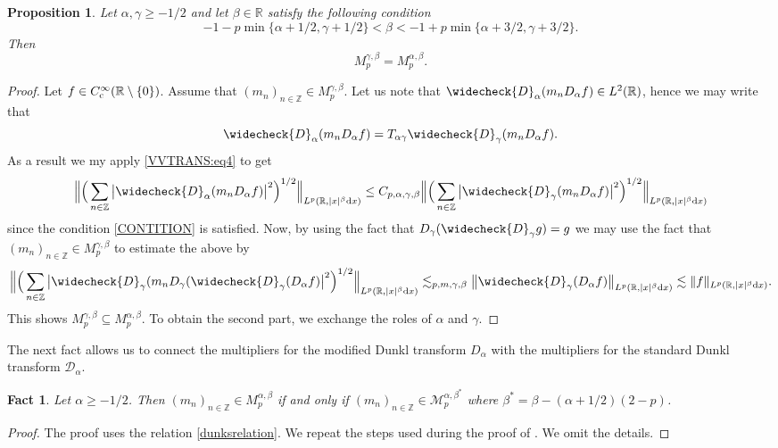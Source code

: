 \documentclass[11pt,oneside]{amsart}
\numberwithin{equation}{section}
\newtheorem{proposition}[equation]{Proposition}
\newtheorem{fact}[equation]{Fact}
\theoremstyle{definition}
\newcommand{\RR}{\mathbb{R}}
\newcommand{\ZZ}{\mathbb{Z}}
\begin{document}
\begin{proposition}\label{prop:multi}
Let $\alpha,\gamma\geq-1/2$ and let $\beta\in\RR$ satisfy the following condition
\begin{equation}\label{CONTITION}
    -1-p\min{\big\{\alpha+1/2,\gamma+1/2\big\}}<\beta<-1+p\min{\big\{\alpha+3/2,\gamma+3/2\big\}}.
\end{equation}
Then
\begin{equation*}
    M_p^{\gamma,\beta}=M_p^{\alpha,\beta}.
\end{equation*}
\end{proposition}
\begin{proof}
Let $f\in C_{\rm c}^\infty(\RR\setminus\{0\})$. Assume that $(m_n)_{n\in\ZZ}\in M_p^{\gamma,\beta}$.
Let us note that $\widecheck{D}_\alpha(m_n D_\alpha f)\in L^2(\RR)$, hence we may write that
\begin{equation*}
    \widecheck{D}_\alpha(m_n D_\alpha f)=T_{\alpha\gamma}\widecheck{D}_\gamma(m_n D_\alpha f).
\end{equation*}
As a result we my apply \eqref{VVTRANS:eq4} to get
\begin{equation*}
    \Big\|\Big(\sum_{n\in\ZZ}\big|\widecheck{D}_\alpha(m_n D_\alpha f)\big|^2\Big)^{1/2}\Big\|_{L^p(\RR,|x|^\beta{\rm d}x)}\leq C_{p,\alpha,\gamma,\beta} \Big\|\Big(\sum_{n\in\ZZ}\big|\widecheck{D}_\gamma(m_n D_\alpha f)\big|^2\Big)^{1/2}\Big\|_{L^p(\RR,|x|^\beta{\rm d}x)}
\end{equation*}
since the condition \eqref{CONTITION} is satisfied. Now, by using the fact that $D_\gamma(\widecheck{D}_\gamma g)=g$ we may use the fact that $(m_n)_{n\in\ZZ}\in M_p^{\gamma,\beta}$ to estimate the above by
\begin{equation*}
    \Big\|\Big(\sum_{n\in\ZZ}\big|\widecheck{D}_\gamma(m_n D_\gamma(\widecheck{D}_\gamma(D_\alpha f)\big|^2\Big)^{1/2}\Big\|_{L^p(\RR,|x|^\beta{\rm d}x)}\lesssim_{p,m,\gamma,\beta}\big\|\widecheck{D}_\gamma(D_\alpha f)\big\|_{L^p(\RR,|x|^\beta{\rm d}x)}\lesssim\|f\|_{L^p(\RR,|x|^\beta{\rm d}x)}.
\end{equation*}
This shows $M_p^{\gamma,\beta}\subseteq M_p^{\alpha,\beta}$. To obtain the second part, we exchange the roles of $\alpha$ and $\gamma$.
\end{proof}
The next fact allows us to connect the multipliers for the modified Dunkl transform $D_\alpha$ with the multipliers for the standard Dunkl transform $\mathcal{D}_\alpha$.

\begin{fact}\label{fact:multi}
Let $\alpha\geq -1/2$. Then $(m_n)_{n\in\mathbb{Z}}\in M_{p}^{\alpha,\beta}$ if and only if $(m_n)_{n\in\mathbb{Z}}\in\mathcal{M}_{p}^{\alpha,\beta^*}$ where $\beta^*=\beta-(\alpha+1/2)(2-p)$.
\end{fact}
\begin{proof}
The proof uses the relation \eqref{dunksrelation}. We repeat the steps used during the proof of \cite[Proposition 3.4]{NowakStempak}. We omit the details.
\end{proof}
\end{document}
